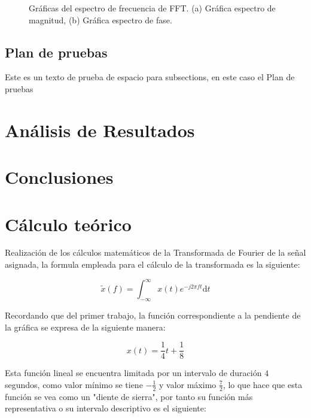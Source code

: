 \documentclass[11pt,letterpaper,twocolumn]{article}
\begin{document}
\begin{figure}[H]
\begin{subfigure}[h]{0.49\linewidth}
            \label{faseFFT}
            \caption{}
        \end{subfigure}
        \caption{Gráficas del espectro de frecuencia de FFT. (a) Gráfica 
                espectro de magnitud, (b) Gráfica espectro de fase.}
        \label{espectroFFT}
    \end{figure} 
    
    
    
    \subsection{Plan de pruebas}
        Este es un texto de prueba de espacio para subsections, en este caso 
        el Plan de pruebas

\section{Análisis de Resultados}
\section{Conclusiones}

\appendix
\section{Cálculo teórico}

    Realización de los cálculos matemáticos de la Transformada de Fourier de la señal 
    asignada, la formula empleada para el cálculo de la transformada es la siguiente:

    \begin{equation}
        \tilde{x}(f)=\int_{-\infty}^{\infty}x(t)e^{-j2\pi ft} \mathrm{d}t
        \label{transformadaFourier}
    \end{equation}

    Recordando que del primer trabajo, la función correspondiente a la pendiente de la 
    gráfica se expresa de la siguiente manera:

    \begin{equation}
        x(t)=\frac{1}{4} t + \frac{1}{8}
        \label{funcionLineal}
    \end{equation}

    Esta función lineal se encuentra limitada por un intervalo de duración $4$ segundos, como valor
    mínimo se tiene $-\frac{1}{2}$ y valor máximo $\frac{7}{2}$, lo que hace que esta 
    función se vea como un "diente de sierra", por tanto su función más representativa o
    su intervalo descriptivo es el siguiente:
    
\end{document}

